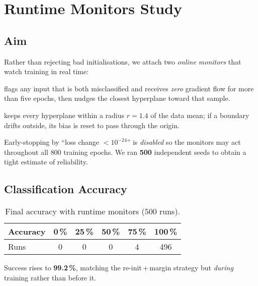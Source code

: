 \section{Runtime Monitors Study}
\label{sec:relu1-monitors}

\subsection*{Aim}
Rather than rejecting bad initialisations, we attach two \emph{online
monitors} that watch training in real time:

\begin{description}[leftmargin=2em,style=sameline]
  \item[DeadSampleMonitor] flags any input that is both misclassified
        and receives \emph{zero} gradient flow for more than five epochs,
        then nudges the closest hyperplane toward that sample.
  \item[BoundsMonitor] keeps every hyperplane within a radius
        $r = 1.4$ of the data mean; if a boundary drifts outside, its
        bias is reset to pass through the origin.
\end{description}

Early-stopping by ``loss change $\!\!<\!10^{-24}$'' is \emph{disabled}
so the monitors may act throughout all $800$ training epochs.
We ran \textbf{500} independent seeds to obtain a tight estimate of
reliability.

\subsection*{Classification Accuracy}

\begin{table}[h]
\centering
\caption{Final accuracy with runtime monitors ($500$ runs).}
\label{tab:relu1-monitor-accuracy}
\begin{tabular}{lccccc}
\toprule
Accuracy & 0\,\% & 25\,\% & 50\,\% & 75\,\% & 100\,\% \\
\midrule
Runs & 0 & 0 & 0 & 4 & 496 \\
\bottomrule
\end{tabular}
\end{table}

Success rises to \textbf{99.2\,\%}, matching the re-init\,+\,margin
strategy but \emph{during} training rather than before it.

